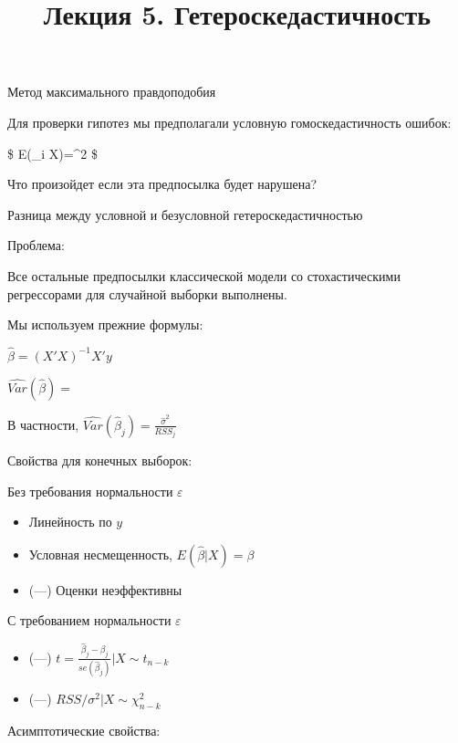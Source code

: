 \documentclass[ignorenonframetext,]{beamer}
\title{Лекция 5. Гетероскедастичность}
\begin{document}
\frame{\titlepage}

\begin{frame}{Метод максимального правдоподобия}

Для проверки гипотез мы предполагали условную гомоскедастичность ошибок:

\$ E(\varepsilon\_i \textbar{} X)=\sigma\^{}2 \$

Что произойдет если эта предпосылка будет нарушена?

\end{frame}

\begin{frame}{Разница между условной и безусловной
гетероскедастичностью}

\end{frame}

\begin{frame}{Проблема:}

Все остальные предпосылки классической модели со стохастическими
регрессорами для случайной выборки выполнены.

Мы используем прежние формулы:

$\hat{\beta}=(X'X)^{-1}X'y$

$\widehat{Var}(\hat{\beta})=$

В частности, $\widehat{Var}(\hat{\beta}_j)=\frac{\hat{\sigma}^2}{RSS_j}$

\end{frame}

\begin{frame}{Свойства для конечных выборок:}

Без требования нормальности $\varepsilon$

\begin{itemize}
\item
  Линейность по $y$
\item
  Условная несмещенность, $E(\hat{\beta}|X)=\beta$
\item
  (---) Оценки неэффективны
\end{itemize}

\end{frame}

\begin{frame}{С требованием нормальности $\varepsilon$}

\begin{itemize}
\item
  (---)
  $t=\frac{\hat{\beta}_j-\beta_j}{se(\hat{\beta}_j)} | X \sim t_{n-k}$
\item
  (---) $RSS/\sigma^2 |X \sim \chi^2_{n-k}$
\end{itemize}

\end{frame}

\begin{frame}{Асимптотические свойства:}

\end{frame}
\end{document}

